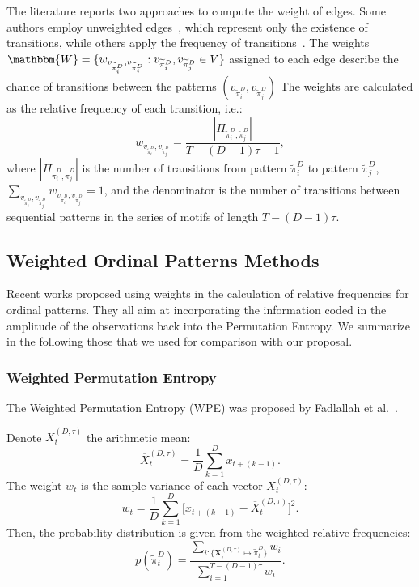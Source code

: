 \documentclass[journal]{IEEEtran}
\begin{document}
	The literature reports two approaches to compute the weight of edges.
	Some authors employ unweighted edges~\cite{McCullough2015lagged, Kulp2016ordinal}, which represent only the existence of transitions, while others apply the frequency of transitions~\cite{Sorrentino2015periodic, Zhang2017ConstructingOP}.
	The weights $\mathbbm{W} = \{w_{v_{\widetilde{\pi}^D_i}, v_{\widetilde\pi^D_j}}: v_{\widetilde\pi^D_i}, v_{\widetilde\pi^D_j} \in V \}$ assigned to each edge describe the chance of transitions between the patterns $(v_{\widetilde\pi^D_i}, v_{\widetilde\pi^D_j})$
	The weights are calculated as the relative frequency of each transition, i.e.:
	\begin{equation}
	w_{v_{\widetilde\pi^D_i}, v_{\widetilde\pi^D_j}} = \frac{|\Pi_{\widetilde\pi^D_i,\widetilde\pi^D_j}|}{T-(D-1)\tau-1},
	\end{equation}
	where $|\Pi_{\widetilde\pi^D_i,\widetilde\pi^D_j}|$ is the number of transitions from pattern $\widetilde\pi^D_i$ to pattern $\widetilde\pi^D_j$, $\sum_{v_{\widetilde\pi^D_i}, v_{\widetilde\pi^D_j}}w_{v_{\widetilde\pi^D_i}, v_{\widetilde\pi^D_j}} = 1$,
	and the denominator is the number of transitions between sequential patterns in the series of motifs of length $T-(D-1)\tau$.
	
	\subsection{Weighted Ordinal Patterns Methods}\label{Methods}
	
	Recent works proposed using weights in the calculation of relative frequencies for ordinal patterns.
	They all aim at incorporating the information coded in the amplitude of the observations back into the Permutation Entropy.
	We summarize in the following those that we used for comparison with our proposal.
	
	\subsubsection{Weighted Permutation Entropy}\label{WPE}
	
	The Weighted Permutation Entropy (WPE) was proposed by Fadlallah et al.~\cite{Fadlallah2013Weightedpermutation}. 
	
	Denote $\overline{X}_t^{(D, \tau)}$ the arithmetic mean:
	\begin{equation}
	\overline{X}_t^{(D, \tau)} = \frac{1}{D} \sum_{k = 1}^{D} x_{t + (k - 1)}.
	\end{equation}
	The weight $w_{t}$ is the sample variance of each vector $X_t^{(D, \tau)}$:
	\begin{equation}
	w_{t} = \frac{1}{D} \sum_{k = 1}^{D}\big[x_{t + (k - 1)} - \overline{X}_t^{(D, \tau)}\big]^2 .
	\end{equation}
	Then, the probability distribution is given from the weighted relative frequencies:
	\begin{equation}
	p(\widetilde \pi_t^D) = \frac{\sum_{i : \{\mathbf{X}^{(D,\tau)}_i \mapsto \widetilde\pi^D_t\}} w_{i}}{\sum_{i = 1}^{T-(D-1)\tau} w_{i}}.
	\end{equation}
	
\end{document}
